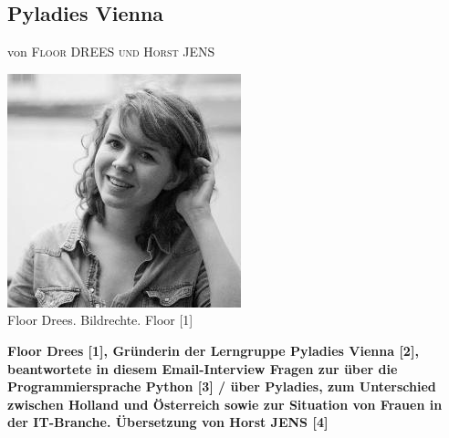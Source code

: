 \documentclass[10pt,a4paper,ngerman,twoside]{article} %
\newcommand{\NewsItem}[1]{ %
\usefont{T1}{fvs}{n}{n} %
\vspace{24pt}\large #1\vspace{3pt} %
\par \normalsize \normalfont}
\newcommand{\NewsAuthor}[1]{ %
\hfill von \textsc{#1} \vspace{20pt} %
\par \normalfont}
\begin{document}
\begin{multicols}{3}
\NewsItem{}
\section*{Pyladies Vienna}
\label{floor}
\NewsAuthor{Floor DREES und Horst JENS}
\begin{center}
\includegraphics[width=\linewidth]{floor/floor.jpg} \\
\footnotesize{Floor Drees. Bildrechte. Floor [1]}
\end{center}
\textbf{Floor Drees [1], Gründerin der Lerngruppe Pyladies Vienna [2], beantwortete in diesem Email-Interview Fragen zur über die Programmiersprache Python [3] / über Pyladies, zum Unterschied zwischen Holland und Österreich sowie zur Situation von Frauen in der IT-Branche. Übersetzung von Horst JENS [4]} \\
\begin{center}

\end{center}
\end{multicols}
\end{document}
